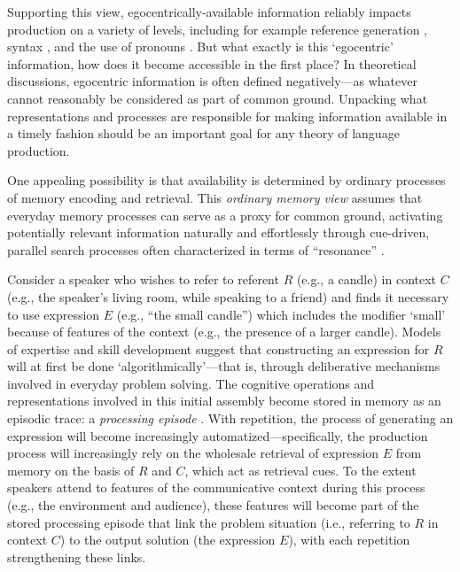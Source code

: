 \documentclass[natbib,doc,a4paper]{apa6}
\begin{document}
Supporting this view, egocentrically-available information reliably impacts production on a variety of levels, including for example reference generation \citep{wardlowlanegroismanferreira06}, syntax \citep{ferreiradell00}, and the use of pronouns \citep{FukumuraVanGompel2012}. But what exactly is this `egocentric' information, how does it become accessible in the first place? In theoretical discussions, egocentric information is often defined negatively---as whatever cannot reasonably be considered as part of common ground. Unpacking what representations and processes are responsible for making information available in a timely fashion should be an important goal for any theory of language production.

One appealing possibility is that availability is determined by ordinary processes of memory encoding and retrieval.  This \emph{ordinary memory view} \citep{hortongerrig05} assumes that everyday memory processes can serve as a proxy for common ground, activating potentially relevant information naturally and effortlessly through cue-driven, parallel search processes often characterized in terms of ``resonance'' \citep[e.g.,][]{hintzman86}.  

Consider a speaker who wishes to refer to referent \(R\) (e.g., a candle) in context \(C\) (e.g., the speaker's living room, while speaking to a friend) and finds it necessary to use expression \(E\) (e.g., ``the small candle'') which includes the modifier `small' because of features of the context (e.g., the presence of a larger candle).  Models of expertise and skill development \citep{logan88,loganetherton94} suggest that constructing an expression for \(R\) will at first be done `algorithmically'---that is, through deliberative mechanisms involved in everyday problem solving. The cognitive operations and representations involved in this initial assembly become stored in memory as an episodic trace: a \emph{processing episode} \citep{logan88}. With repetition, the process of generating an expression will become increasingly automatized---specifically, the production process will increasingly rely on the wholesale retrieval of expression \(E\) from memory on the basis of \(R\) and \(C\), which act as retrieval cues. To the extent speakers attend to features of the communicative context during this process (e.g., the environment and audience), these features will become part of the stored processing episode that link the problem situation (i.e., referring to \(R\) in context \(C\)) to the output solution (the expression \(E\)), with each repetition strengthening these links.
\end{document}

